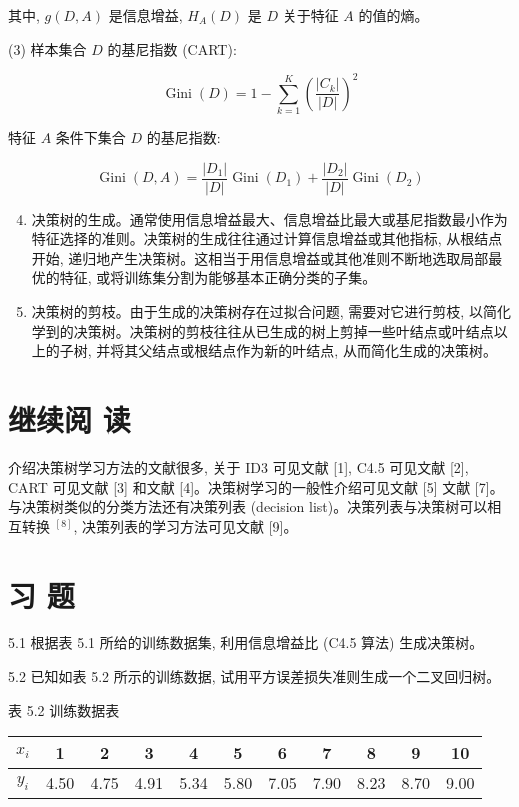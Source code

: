 \documentclass[10pt]{article}
\begin{document}
\begin{CJK*}{UTF8}{bsmi}
其中, $g(D, A)$ 是信息增益, $H_{A}(D)$ 是 $D$ 关于特征 $A$ 的值的熵。

(3) 样本集合 $D$ 的基尼指数 (CART):

$$
\operatorname{Gini}(D)=1-\sum_{k=1}^{K}\left(\frac{\left|C_{k}\right|}{|D|}\right)^{2}
$$

特征 $A$ 条件下集合 $D$ 的基尼指数:

$$
\operatorname{Gini}(D, A)=\frac{\left|D_{1}\right|}{|D|} \operatorname{Gini}\left(D_{1}\right)+\frac{\left|D_{2}\right|}{|D|} \operatorname{Gini}\left(D_{2}\right)
$$

\begin{enumerate}
  \setcounter{enumi}{3}
  \item 决策树的生成。通常使用信息增益最大、信息增益比最大或基尼指数最小作为特征选择的准则。决策树的生成往往通过计算信息增益或其他指标, 从根结点开始, 递归地产生决策树。这相当于用信息增益或其他准则不断地选取局部最优的特征, 或将训练集分割为能够基本正确分类的子集。

  \item 决策树的剪枝。由于生成的决策树存在过拟合问题, 需要对它进行剪枝, 以简化学到的决策树。决策树的剪枝往往从已生成的树上剪掉一些叶结点或叶结点以上的子树, 并将其父结点或根结点作为新的叶结点, 从而简化生成的决策树。

\end{enumerate}

\section*{继续阅 读}
介绍决策树学习方法的文献很多, 关于 ID3 可见文献 [1], C4.5 可见文献 [2], CART 可见文献 [3] 和文献 [4]。决策树学习的一般性介绍可见文献 [5] 文献 [7]。与决策树类似的分类方法还有决策列表 (decision list)。决策列表与决策树可以相互转换 ${ }^{[8]}$, 决策列表的学习方法可见文献 [9]。

\section*{习 题}
5.1 根据表 5.1 所给的训练数据集, 利用信息增益比 (C4.5 算法) 生成决策树。

5.2 已知如表 5.2 所示的训练数据, 试用平方误差损失准则生成一个二叉回归树。

表 5.2 训练数据表

\begin{center}
\begin{tabular}{ccccccccccc}
\hline
$x_{i}$ & 1 & 2 & 3 & 4 & 5 & 6 & 7 & 8 & 9 & 10 \\
\hline
$y_{i}$ & 4.50 & 4.75 & 4.91 & 5.34 & 5.80 & 7.05 & 7.90 & 8.23 & 8.70 & 9.00 \\
\hline
\end{tabular}
\end{center}


\end{CJK*}
\end{document}
